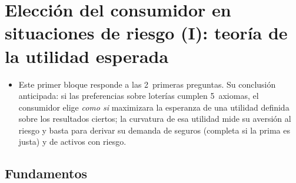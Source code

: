 \documentclass[11pt]{article}
\begin{document}
\section{Elección del consumidor en situaciones de riesgo (I):\cortetitulo{} teoría de la utilidad esperada}\label{sec:utilidad-esperada}

\begin{itemize}
\item Este primer bloque responde a las 2~primeras preguntas. Su conclusión anticipada: si las preferencias sobre loterías cumplen 5~axiomas, el consumidor elige \emph{como si} maximizara la esperanza de una utilidad definida sobre los resultados ciertos; la curvatura de esa utilidad mide su aversión al riesgo y basta para derivar su demanda de seguros (completa si la prima es justa) y de activos con riesgo.
\end{itemize}

\subsection{Fundamentos}\label{sec:fundamentos}
\end{document}
